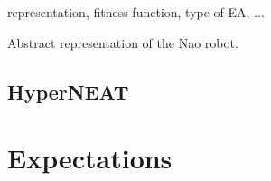 \documentclass[10pt]{article}
\begin{document}
representation, fitness function,
type of EA, ...

Abstract representation of the Nao robot.

\subsection{HyperNEAT}

\section{Expectations}



\end{document}
